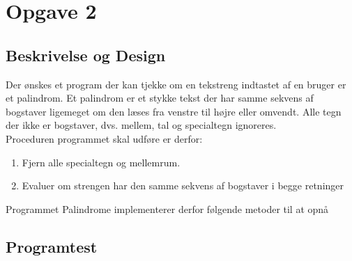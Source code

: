 \section{Opgave 2}
\subsection{Beskrivelse og Design}
	Der ønskes et program der kan tjekke om en tekstreng indtastet af en bruger er et palindrom. Et 	palindrom er et stykke tekst der har samme sekvens af bogstaver ligemeget om den læses fra 			venstre til højre eller omvendt. Alle tegn der ikke er bogstaver, dvs. mellem, tal og 				specialtegn ignoreres. \\
	Proceduren programmet skal udføre er derfor:
	\begin{enumerate}
		\item Fjern alle specialtegn og mellemrum.
		\item Evaluer om strengen har den samme sekvens af bogstaver i begge retninger
	\end{enumerate}
	Programmet Palindrome implementerer derfor følgende metoder til at opnå 
\subsection{Programtest}